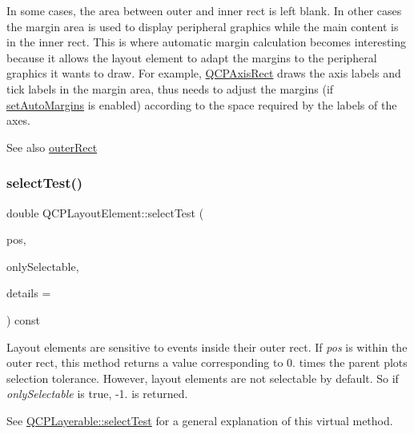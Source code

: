 In some cases, the area between outer and inner rect is left blank. In other cases the margin area is used to display peripheral graphics while the main content is in the inner rect. This is where automatic margin calculation becomes interesting because it allows the layout element to adapt the margins to the peripheral graphics it wants to draw. For example, \hyperlink{classQCPAxisRect}{Q\+C\+P\+Axis\+Rect} draws the axis labels and tick labels in the margin area, thus needs to adjust the margins (if \hyperlink{classQCPLayoutElement_accfda49994e3e6d51ed14504abf9d27d}{set\+Auto\+Margins} is enabled) according to the space required by the labels of the axes.

\begin{DoxySeeAlso}{See also}
\hyperlink{classQCPLayoutElement_a2a32a12a6161c9dffbadeb9cc585510c}{outer\+Rect} 
\end{DoxySeeAlso}
\mbox{\label{classQCPLayoutElement_ae97f483cccedadbf18ea4525ef240ee4}} 
\subsubsection{\texorpdfstring{select\+Test()}{selectTest()}}
{\footnotesize\ttfamily double Q\+C\+P\+Layout\+Element\+::select\+Test (\begin{DoxyParamCaption}\item[{const Q\+PointF \&}]{pos,  }\item[{bool}]{only\+Selectable,  }\item[{Q\+Variant $\ast$}]{details = {} }\end{DoxyParamCaption}) const\hspace{0.3cm}{\ttfamily [virtual]}}

Layout elements are sensitive to events inside their outer rect. If {\itshape pos} is within the outer rect, this method returns a value corresponding to 0. times the parent plot\textquotesingle{}s selection tolerance. However, layout elements are not selectable by default. So if {\itshape only\+Selectable} is true, -\/1. is returned.

See \hyperlink{classQCPLayerable_a04db8351fefd44cfdb77958e75c6288e}{Q\+C\+P\+Layerable\+::select\+Test} for a general explanation of this virtual method.

